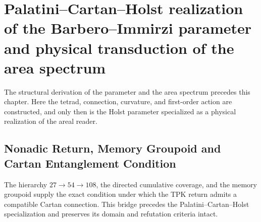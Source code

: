 \chapter{Palatini–Cartan–Holst realization of the Barbero–Immirzi parameter and physical transduction of the area spectrum}
\label{chap:parte-iv-68}

The structural derivation of the parameter and the area spectrum precedes this chapter. Here the tetrad, connection, curvature, and first-order action are constructed, and only then is the Holst parameter specialized as a physical realization of the areal reader.



\section{Nonadic Return, Memory Groupoid and Cartan Entanglement Condition}

The hierarchy \(27\to54\to108\), the directed cumulative coverage, and the
memory groupoid supply the exact condition under which the
TPK return admits a compatible Cartan connection. This bridge precedes the
Palatini--Cartan--Holst specialization and preserves its domain and
refutation criteria intact.

\begingroup
\let\chapter\section
\let\section\subsection
\let\subsection\subsubsection
\let\subsubsection\paragraph
\let\clearpage\relax
\let\cleardoublepage\relax

\endgroup

